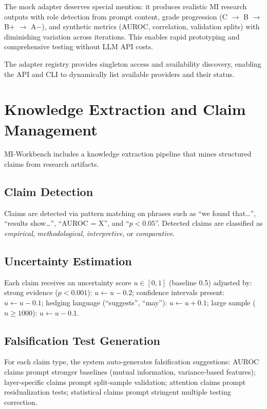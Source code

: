 \documentclass[11pt,a4paper]{article}
\begin{document}
The mock adapter deserves special mention: it produces realistic MI research outputs with role detection from prompt content, grade progression (C $\to$ B $\to$ B$+$ $\to$ A$-$), and synthetic metrics (AUROC, correlation, validation splits) with diminishing variation across iterations.
This enables rapid prototyping and comprehensive testing without LLM API costs.

The adapter registry provides singleton access and availability discovery, enabling the API and CLI to dynamically list available providers and their status.


\section{Knowledge Extraction and Claim Management}
\label{sec:knowledge}

MI-Workbench includes a knowledge extraction pipeline that mines structured claims from research artifacts.

\subsection{Claim Detection}
Claims are detected via pattern matching on phrases such as ``we found that\ldots'', ``results show\ldots'', ``AUROC = X'', and ``$p < 0.05$''.
Detected claims are classified as \emph{empirical}, \emph{methodological}, \emph{interpretive}, or \emph{comparative}.

\subsection{Uncertainty Estimation}
Each claim receives an uncertainty score $u \in [0, 1]$ (baseline 0.5) adjusted by:
strong evidence ($p < 0.001$): $u \leftarrow u - 0.2$;
confidence intervals present: $u \leftarrow u - 0.1$;
hedging language (``suggests'', ``may''): $u \leftarrow u + 0.1$;
large sample ($n \geq 1000$): $u \leftarrow u - 0.1$.

\subsection{Falsification Test Generation}
For each claim type, the system auto-generates falsification suggestions:
AUROC claims prompt stronger baselines (mutual information, variance-based features);
layer-specific claims prompt split-sample validation;
attention claims prompt residualization tests;
statistical claims prompt stringent multiple testing correction.
\end{document}
